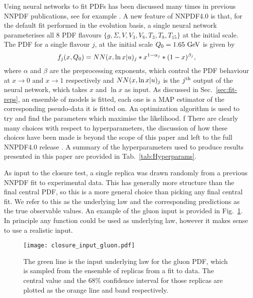 Using neural networks to fit PDFs has been discussed many times in previous
NNPDF publications, see for example \cite{nnpdf30, Ball_2017}. A new feature of
NNPDF4.0 is that, for the default fit performed in the evolution basis, a single
neural network parameterises all 8 PDF flavours $\{ g, \Sigma, V, V_3, V_8, T_3,
T_8, T_{15} \}$ at the initial scale. The PDF for a single flavour $j$, at the
initial scale $Q_0 = 1.65~{\rm GeV}$ is given by
\begin{equation}
    f_j(x, Q_0) = NN(x, \ln x | u)_j * x^{1-\alpha_j} * (1-x)^{\beta_j},
\end{equation}
where $\alpha$ and $\beta$ are the preprocessing exponents, which control the
PDF behaviour at $x \to 0$ and $x \to 1$ respectively and $NN(x, \ln x |
u)_j$ is the $j^{\rm th}$ output of the neural network, which takes $x$
and $\ln x$ as input. As discussed in Sec.~\ref{sec:fit-reps}, an ensemble of
models is fitted, each one is a MAP estimator of the corresponding pseudo-data
it is fitted on. An optimization algorithm is used to try and find the
parameters which maximise the likelihood. 
f%
There are clearly many choices with respect to
hyperparameters, the discussion of how these choices have been made is beyond
the scope of this paper and left to the full NNPDF4.0 release \cite{NNPDF40}. A
summary of the hyperparameters used to produce results presented in this paper
are provided in Tab.~\ref{tab:Hyperparams}.

As input to the closure test, a single replica was drawn randomly from a
previous NNPDF fit to experimental data. This
has generally more structure than the final central PDF, so this is a
more general choice than picking any final central fit. We refer to this as the underlying law
and the corresponding predictions as the true observable values. An example of
the gluon input is provided in Fig.~\ref{fig:InputGluonPDF}. In principle any
function could be used as underlying law, however it makes sense to use a
realistic input. 

\begin{figure}
    \centering
    \texttt{[image: closure\_input\_gluon.pdf]}
    \caption{The green line is the input underlying law for the gluon PDF, which
    is sampled from the ensemble of replicas from a fit to data. The central
    value and the 68\% confidence interval for those replicas are plotted as the
    orange line and band respectively.}
    \label{fig:InputGluonPDF}
\end{figure}

